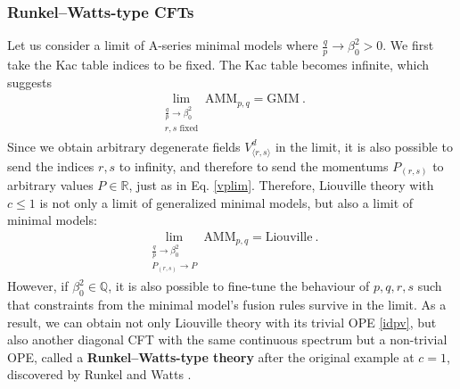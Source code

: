 \documentclass[12pt, a4paper]{article}
\newcommand{\myindex}[1]{\textbf{\boldmath #1}}
\theoremstyle{break}
\begin{document}
\subsubsection{Runkel--Watts-type CFTs}\label{sec:rwt}

Let us consider a limit of A-series minimal models where $\frac{q}{p}\to \beta_0^2>0$. We first take the Kac table indices to be fixed. 
The Kac table becomes infinite, which suggests 
\begin{align}
 \lim_{\substack{\frac{q}{p}\to \beta_0^2\\ r,s\text{ fixed}}} \text{AMM}_{p,q} = \text{GMM}\ . 
 \label{mm-gmm}
\end{align}
Since we obtain arbitrary degenerate fields $V^d_{\langle r,s\rangle}$ in the limit, it is also possible to send the indices $r,s$ to infinity, and therefore to send the momentums $P_{(r,s)}$ to arbitrary values $P\in\mathbb{R}$, just as in Eq. \eqref{vplim}. Therefore, Liouville theory with $c\leq 1$ is not only a limit of generalized minimal models, but also a limit of minimal models:
\begin{align}
 \lim_{\substack{\frac{q}{p}\to \beta_0^2\\ P_{(r,s)}\to P}} \text{AMM}_{p,q} = \text{Liouville}\ . 
 \label{mm-liou}
\end{align}
However, if $\beta_0^2\in\mathbb{Q}$, it is also possible to fine-tune the behaviour of $p,q,r,s$ such that constraints from the minimal model's fusion rules survive in the limit. As a result, we can obtain not only Liouville theory with its trivial OPE \eqref{idpv}, but also another diagonal CFT with the same continuous spectrum but a non-trivial OPE, called a \myindex{Runkel--Watts-type theory} after the original example at $c=1$, discovered by Runkel and Watts \cite{rw01}. 
\end{document}
